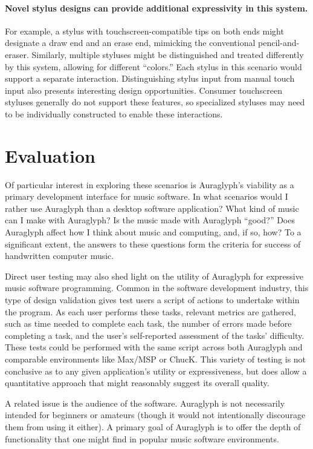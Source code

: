 \documentclass[10pt,letterpaper]{article}
\begin{document}
\paragraph{Novel stylus designs can provide additional expressivity in this system.}
For example, a stylus with touchscreen-compatible tips on both ends might designate a draw end and an erase end, mimicking the conventional pencil-and-eraser. 
Similarly, multiple styluses might be distinguished and treated differently by this system, allowing for different ``colors.''
Each stylus in this scenario would support a separate interaction. 
Distinguishing stylus input from manual touch input also presents interesting design opportunities. 
Consumer touchscreen styluses generally do not support these features, so specialized styluses may need to be individually constructed to enable these interactions. 

\section{Evaluation}
Of particular interest in exploring these scenarios is Auraglyph's viability as a primary development interface for music software. 
In what scenarios would I rather use Auraglyph than a desktop software application? 
What kind of music can I make with Auraglyph? 
Is the music made with Auraglyph ``good?'' 
Does Auraglyph affect how I think about music and computing, and, if so, how? 
To a significant extent, the answers to these questions form the criteria for success of handwritten computer music. 

Direct user testing may also shed light on the utility of Auraglyph for expressive music software programming. 
Common in the software development industry, this type of design validation gives test users a script of actions to undertake within the program. 
As each user performs these tasks, relevant metrics are gathered, such as time needed to complete each task, the number of errors made before completing a task, and the user's self-reported assessment of the tasks' difficulty. 
These tests could be performed with the same script across both Auraglyph and comparable environments like Max/MSP or ChucK. 
This variety of testing is not conclusive as to any given application's utility or expressiveness, but does allow a quantitative approach that might reasonably suggest its overall quality. 

A related issue is the audience of the software. 
Auraglyph is not necessarily intended for beginners or amateurs (though it would not intentionally discourage them from using it either). 
A primary goal of Auraglyph is to offer the depth of functionality that one might find in popular music software environments. 
\end{document}
